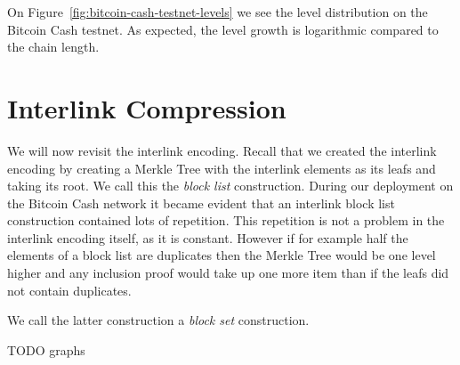 On Figure~\ref{fig:bitcoin-cash-testnet-levels} we see the level distribution on the Bitcoin Cash testnet. As expected, the level growth is logarithmic compared to the chain length.

\section{Interlink Compression}
We will now revisit the interlink encoding. Recall that we created the interlink encoding by creating a Merkle Tree with the interlink elements as its leafs and taking its root. We call this the \textit{block list} construction. During our deployment on the Bitcoin Cash network it became evident that an interlink block list construction contained lots of repetition. This repetition is not a problem in the interlink encoding itself, as it is constant. However if for example half the elements of a block list are duplicates then the Merkle Tree would be one level higher and any inclusion proof would take up one more item than if the leafs did not contain duplicates.

We call the latter construction a \textit{block set} construction.

TODO graphs
